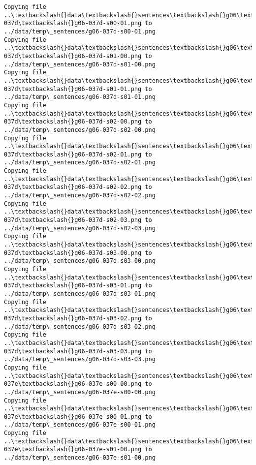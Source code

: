 \documentclass[11pt]{article}
\begin{document}
\begin{Verbatim}[commandchars=\\\{\}]
Copying file ..\textbackslash{}data\textbackslash{}sentences\textbackslash{}g06\textbackslash{}g06-037d\textbackslash{}g06-037d-s00-01.png to
../data/temp\_sentences/g06-037d-s00-01.png
Copying file ..\textbackslash{}data\textbackslash{}sentences\textbackslash{}g06\textbackslash{}g06-037d\textbackslash{}g06-037d-s01-00.png to
../data/temp\_sentences/g06-037d-s01-00.png
Copying file ..\textbackslash{}data\textbackslash{}sentences\textbackslash{}g06\textbackslash{}g06-037d\textbackslash{}g06-037d-s01-01.png to
../data/temp\_sentences/g06-037d-s01-01.png
Copying file ..\textbackslash{}data\textbackslash{}sentences\textbackslash{}g06\textbackslash{}g06-037d\textbackslash{}g06-037d-s02-00.png to
../data/temp\_sentences/g06-037d-s02-00.png
Copying file ..\textbackslash{}data\textbackslash{}sentences\textbackslash{}g06\textbackslash{}g06-037d\textbackslash{}g06-037d-s02-01.png to
../data/temp\_sentences/g06-037d-s02-01.png
Copying file ..\textbackslash{}data\textbackslash{}sentences\textbackslash{}g06\textbackslash{}g06-037d\textbackslash{}g06-037d-s02-02.png to
../data/temp\_sentences/g06-037d-s02-02.png
Copying file ..\textbackslash{}data\textbackslash{}sentences\textbackslash{}g06\textbackslash{}g06-037d\textbackslash{}g06-037d-s02-03.png to
../data/temp\_sentences/g06-037d-s02-03.png
Copying file ..\textbackslash{}data\textbackslash{}sentences\textbackslash{}g06\textbackslash{}g06-037d\textbackslash{}g06-037d-s03-00.png to
../data/temp\_sentences/g06-037d-s03-00.png
Copying file ..\textbackslash{}data\textbackslash{}sentences\textbackslash{}g06\textbackslash{}g06-037d\textbackslash{}g06-037d-s03-01.png to
../data/temp\_sentences/g06-037d-s03-01.png
Copying file ..\textbackslash{}data\textbackslash{}sentences\textbackslash{}g06\textbackslash{}g06-037d\textbackslash{}g06-037d-s03-02.png to
../data/temp\_sentences/g06-037d-s03-02.png
Copying file ..\textbackslash{}data\textbackslash{}sentences\textbackslash{}g06\textbackslash{}g06-037d\textbackslash{}g06-037d-s03-03.png to
../data/temp\_sentences/g06-037d-s03-03.png
Copying file ..\textbackslash{}data\textbackslash{}sentences\textbackslash{}g06\textbackslash{}g06-037e\textbackslash{}g06-037e-s00-00.png to
../data/temp\_sentences/g06-037e-s00-00.png
Copying file ..\textbackslash{}data\textbackslash{}sentences\textbackslash{}g06\textbackslash{}g06-037e\textbackslash{}g06-037e-s00-01.png to
../data/temp\_sentences/g06-037e-s00-01.png
Copying file ..\textbackslash{}data\textbackslash{}sentences\textbackslash{}g06\textbackslash{}g06-037e\textbackslash{}g06-037e-s01-00.png to
../data/temp\_sentences/g06-037e-s01-00.png

\end{Verbatim}
\end{document}
